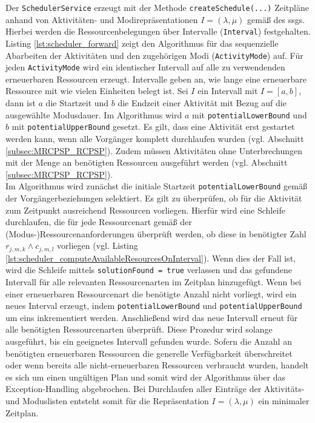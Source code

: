 Der \lstinline|SchedulerService| erzeugt mit der Methode \lstinline|createSchedule(...)| Zeitpläne anhand von Aktivitäten- und Modirepräsentationen $I = (\lambda, \mu)$ gemäß des \ac{ssgs}. Hierbei werden die Ressourcenbelegungen über Intervalle (\lstinline|Interval|) festgehalten. Listing \ref{lst:scheduler_forward} zeigt den Algorithmus für das sequenzielle Abarbeiten der Aktivitäten und den zugehörigen Modi (\lstinline|ActivityMode|) auf. Für jeden \lstinline|ActivityMode| wird ein identischer Intervall auf alle zu verwendenden erneuerbaren Ressourcen erzeugt. Intervalle geben an, wie lange eine erneuerbare Ressource mit wie vielen Einheiten belegt ist. Sei $I$ ein Intervall mit $I = [a, b]$, dann ist $a$ die Startzeit und $b$ die Endzeit einer Aktivität mit Bezug auf die ausgewählte Modusdauer. Im Algorithmus wird $a$ mit \lstinline|potentialLowerBound| und $b$ mit \lstinline|potentialUpperBound| gesetzt. Es gilt, dass eine Aktivität erst gestartet werden kann, wenn alle Vorgänger komplett durchlaufen wurden (vgl. Abschnitt \ref{subsec:MRCPSP_RCPSP}). Zudem müssen Aktivitäten ohne Unterbrechungen mit der Menge an benötigten Ressourcen ausgeführt werden (vgl. Abschnitt \ref{subsec:MRCPSP_RCPSP}). \\

Im Algorithmus wird zunächst die initiale Startzeit \lstinline|potentialLowerBound| gemäß der Vorgängerbeziehungen selektiert. Es gilt zu überprüfen, ob für die Aktivität zum Zeitpunkt ausreichend Ressourcen vorliegen. Hierfür wird eine Schleife durchlaufen, die für jede Ressourcenart gemäß der (Modus-)Ressourcenanforderungen überprüft werden, ob diese in benötigter Zahl $r_{j,m,k} \land c_{j,m,l}$ vorliegen (vgl. Listing \ref{lst:scheduler_computeAvailableResourcesOnInterval}). Wenn dies der Fall ist, wird die Schleife mittels \lstinline|solutionFound = true| verlassen und das gefundene Intervall für alle relevanten Ressourcenarten im Zeitplan hinzugefügt. Wenn bei einer erneuerbaren Ressourcenart die benötigte Anzahl nicht vorliegt, wird ein neues Interval erzeugt, indem \lstinline|potentialLowerBound| und \lstinline|potentialUpperBound| um eins inkrementiert werden. Anschließend wird das neue Intervall erneut für alle benötigten Ressourcenarten überprüft. Diese Prozedur wird solange ausgeführt, bis ein geeignetes Intervall gefunden wurde. Sofern die Anzahl an benötigten erneuerbaren Ressourcen die generelle Verfügbarkeit überschreitet oder wenn bereits alle nicht-erneuerbaren Ressourcen verbraucht wurden, handelt es sich um einen ungültigen Plan und somit wird der Algorithmus über das Exception-Handling abgebrochen. Bei Durchlaufen aller Einträge der Aktivitäts- und Moduslisten entsteht somit für die Repräsentation $I = (\lambda, \mu)$ ein minimaler Zeitplan. \\

